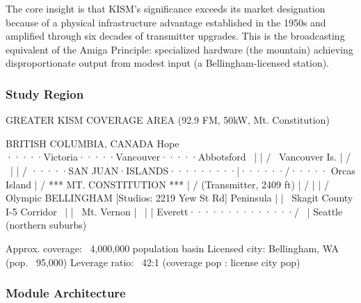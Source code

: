 \documentclass[11pt,letterpaper]{article}
\begin{document}
The core insight is that KISM's significance exceeds its market designation because of a physical infrastructure advantage established in the 1950s and amplified through six decades of transmitter upgrades. This is the broadcasting equivalent of the Amiga Principle: specialized hardware (the mountain) achieving disproportionate output from modest input (a Bellingham-licensed station).

\subsubsection{Study Region}

\begin{asciibox}
GREATER KISM COVERAGE AREA (92.9 FM, 50kW, Mt. Constitution)

                  BRITISH COLUMBIA, CANADA
        Hope ·····Victoria·····Vancouver·····Abbotsford
              \         |          |         /
               \   Vancouver Is.  |        /
                \        |        |       /
    ·····SAN JUAN·ISLANDS·········|······/·····
         Orcas Island             |    /
     *** MT. CONSTITUTION ***     |   /
         (Transmitter, 2409 ft)   |  /
                  |               | /
    Olympic   BELLINGHAM [Studios: 2219 Yew St Rd]
    Peninsula     |               |
         \    Skagit County   I-5 Corridor
          \       |               |
           \  Mt. Vernon          |
            \     |               |
             Everett··············/
              \       |
               Seattle (northern suburbs)

    Approx. coverage: ~4,000,000 population basin
    Licensed city: Bellingham, WA (pop. ~95,000)
    Leverage ratio: ~42:1 (coverage pop : license city pop)
\end{asciibox}

\subsubsection{Module Architecture}
\end{document}
